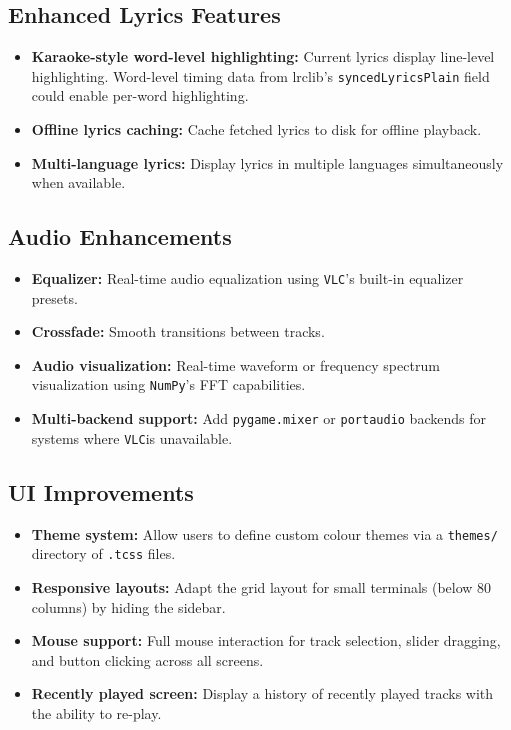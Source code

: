 \documentclass[a4paper,11pt,twoside]{article}
\newcommand{\vlc}{\texttt{VLC}}
\newcommand{\numpy}{\texttt{NumPy}\xspace}
\begin{document}
\subsection{Enhanced Lyrics Features}
\begin{itemize}
    \item \textbf{Karaoke-style word-level highlighting:} Current lyrics
          display line-level highlighting. Word-level timing data from
          lrclib's \texttt{syncedLyricsPlain} field could enable per-word
          highlighting.
    \item \textbf{Offline lyrics caching:} Cache fetched lyrics to disk
          for offline playback.
    \item \textbf{Multi-language lyrics:} Display lyrics in multiple
          languages simultaneously when available.
\end{itemize}

\subsection{Audio Enhancements}
\begin{itemize}
    \item \textbf{Equalizer:} Real-time audio equalization using \vlc's
          built-in equalizer presets.
    \item \textbf{Crossfade:} Smooth transitions between tracks.
    \item \textbf{Audio visualization:} Real-time waveform or frequency
          spectrum visualization using \numpy's FFT capabilities.
    \item \textbf{Multi-backend support:} Add \texttt{pygame.mixer} or
          \texttt{portaudio} backends for systems where \vlc is unavailable.
\end{itemize}

\subsection{UI Improvements}
\begin{itemize}
    \item \textbf{Theme system:} Allow users to define custom colour themes
          via a \texttt{themes/} directory of \texttt{.tcss} files.
    \item \textbf{Responsive layouts:} Adapt the grid layout for small
          terminals (below 80 columns) by hiding the sidebar.
    \item \textbf{Mouse support:} Full mouse interaction for track selection,
          slider dragging, and button clicking across all screens.
    \item \textbf{Recently played screen:} Display a history of recently
          played tracks with the ability to re-play.
\end{itemize}
\end{document}
